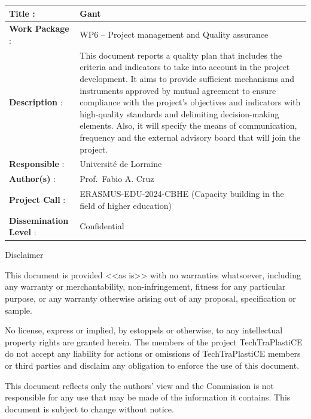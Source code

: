 \documentclass[
  12pt,
  oneside]{book}
\begin{document}
\begin{frontmatter}
\begin{titlepage}
  \vfill

  \begin{tabular}{ >{\raggedright\arraybackslash}p{3.5cm}| p{12.5cm} }
    \toprule
    \textbf{Title} : & Gant  \\ \cmidrule{2-2}  
    \textbf{Work Package} : & WP6 -- Project management and Quality
  assurance  \\ \cmidrule{2-2}
    \textbf{Description} : & This document reports a quality plan that
  includes the criteria and indicators to take into account in the
  project development. It aims to provide sufficient mechanisms and
  instruments approved by mutual agreement to ensure compliance with the
  project's objectives and indicators with high-quality standards and
  delimiting decision-making elements. Also, it will specify the means
  of communication, frequency and the external advisory board that will
  join the project.  \\ \cmidrule{2-2}
    \textbf{Responsible} : & Université de Lorraine  \\ \cmidrule{2-2}
    \textbf{Author(s)} : &  Prof.~Fabio A. Cruz ~ \\ \cmidrule{2-2}
    \textbf{Project Call} : & ERASMUS-EDU-2024-CBHE (Capacity building in the field of higher education)  \\ \cmidrule{2-2}
    \textbf{Dissemination Level} : & Confidential\\ 
  \bottomrule
  \end{tabular}

  \vfill


  

    
    
    \vfill
    
    {\scriptsize\centering\color{lightgray} 
    
    Disclaimer
    
    This document is provided <<as is>> with no warranties whatsoever, 
    including any warranty or merchantability, non-infringement, fitness for any particular 
    purpose, or any warranty otherwise arising out of any proposal, specification or sample.  
    
    No license, express or implied, by estoppels or otherwise, to any intellectual 
    property rights are granted herein. 
    The members of the project TechTraPlastiCE do not accept any liability for actions or 
    omissions of TechTraPlastiCE members or third parties and disclaim any obligation 
    to enforce the use of this document. 
    
    This document reflects only the authors' view and the Commission is not responsible 
    for any use that may be made of the information it contains.  
    This document is subject to change without notice. 
    
    }
    \normalsize
    
    
    
      \end{titlepage}
  \end{frontmatter}
\end{document}
